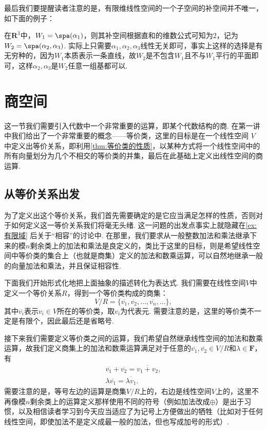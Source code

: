 最后我们要提醒读者注意的是，有限维线性空间的一个子空间的补空间并不唯一，如下面的例子：
\begin{example}{}{}
    在$\mathbf{R}^3$中，$W_1=\spa(\alpha_1)$，则其补空间根据直和的维数公式可知为2，记为$W_2=\spa(\alpha_2,\alpha_3)$. 实际上只需要$\alpha_1,\alpha_2,\alpha_3$线性无关即可，事实上这样的选择是有无穷种的，因为$W_1$本质表示一条直线，故$W_2$是不包含$W_1$且不与$W_1$平行的平面即可，这样$\alpha_2,\alpha_3$是$W_2$任意一组基都可以.
\end{example}

\section{商空间}

这一节我们需要引入代数中一个非常重要的运算，即某个代数结构的商. 在第一讲中我们给出了一个非常重要的概念——等价类，这里的目标是在一个线性空间 $V$ 中定义出等价关系，即利用\autoref{thm:等价类的性质}，以某种方式将一个线性空间中的所有向量划分为几个不相交的等价类的并集，最后在此基础上定义出线性空间的商运算.

\subsection{从等价关系出发}

为了定义出这个等价关系，我们首先需要确定的是它应当满足怎样的性质，否则对于如何定义这一等价关系我们将毫无头绪. 这一问题的出发点事实上就隐藏在\autoref{ex:有限域} 后关于``相容''的讨论中. 在那里，我们要求从一般整数加法和乘法继承下来的模$n$剩余类上的加法和乘法是良定义的，类比于这里的目标，则是希望线性空间中等价类的集合上（也就是商集）定义的加法和数乘运算，可以自然地继承一般的向量加法和乘法，并且保证相容性.

下面我们开始形式化地把上面抽象的描述转化为表达式. 我们需要在线性空间$V$中定义一个等价关系$R$，得到一个等价类构成的商集：
\[V/R=\{\overline{v_1},\overline{v_2},\ldots,\overline{v_n},\ldots\},\]
其中$\overline{v_i}$表示$v_i\in V$所在的等价类，取$v_i$为代表元. 需要注意的是，这里的等价类不一定是有限个，因此最后还是省略号.

接下来我们需要定义等价类之间的运算，我们希望自然继承线性空间的加法和数乘运算，故我们定义商集上的加法和数乘运算满足对于任意的$\overline{v_1},\overline{v_2}\in V/R$和$\lambda\in\mathbf{F}$，有
\begin{equation} \label{eq:10:商集运算}
    \begin{gathered}
        \overline{v_1}+\overline{v_2}=\overline{v_1+v_2},\\
        \lambda\overline{v_1}=\overline{\lambda v_1}.
    \end{gathered}
\end{equation}
需要注意的是，等号左边的运算是商集$V/R$上的，右边是线性空间$V$上的，这里不再像模$n$剩余类上的运算定义那样使用不同的符号（例如加法改成$\oplus$）是出于习惯，以及相信读者学习到今天应当适应了为记号上方便做出的牺牲（比如对于任何线性空间，即使加法不是定义成最一般的加法，但也写成加号的形式）.

